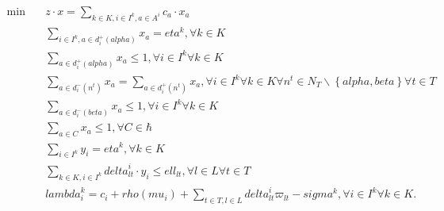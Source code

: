 \begin{align}
  \min\quad & z \cdot x = \sum_{k \in K, i \in I^{k}, a \in A^{i}} c_{a} \cdot x_{a} \tag{eq\_0001} \\
  & \sum_{i \in I^{k}, a \in d_{i}^{+} \left(\mathit{alpha}\right)} x_{a} = \mathit{eta}^{k} , \forall k \in K \tag{eq\_0002} \\
  & \sum_{a \in d_{i}^{+} \left(\mathit{alpha}\right)} x_{a} \leq 1 , \forall i \in I^{k} \forall k \in K \tag{eq\_0003} \\
  & \sum_{a \in d_{i}^{-} \left(n^{t}\right)} x_{a} = \sum_{a \in d_{i}^{+} \left(n^{t}\right)} x_{a} , \forall i \in I^{k} \forall k \in K \forall n^{t} \in N_{T} \backslash \left\{\mathit{alpha} , \mathit{beta}\right\} \forall t \in T \tag{eq\_0004} \\
  & \sum_{a \in d_{i}^{-} \left(\mathit{beta}\right)} x_{a} \leq 1 , \forall i \in I^{k} \forall k \in K \tag{eq\_0005} \\
  & \sum_{a \in C} x_{a} \leq 1 , \forall C \in \hbar \tag{eq\_0006} \\
  & \sum_{i \in I^{k}} y_{i} = \mathit{eta}^{k} , \forall k \in K \tag{eq\_0011} \\
  & \sum_{k \in K, i \in I^{k}} \mathit{delta}_{\mathit{lt}}^{i} \cdot y_{i} \leq \mathit{ell}_{\mathit{lt}} , \forall l \in L \forall t \in T \tag{eq\_0012} \\
  & \mathit{lambda}_{i}^{k} = c_{i} + \mathit{rho} \left(\mathit{mu}_{i}\right) + \sum_{t \in T, l \in L} \mathit{delta}_{\mathit{lt}}^{i} ϖ_{\mathit{lt}} - \mathit{sigma}^{k} , \forall i \in I^{k} \forall k \in K . \tag{eq\_0014} \\
\end{align}
